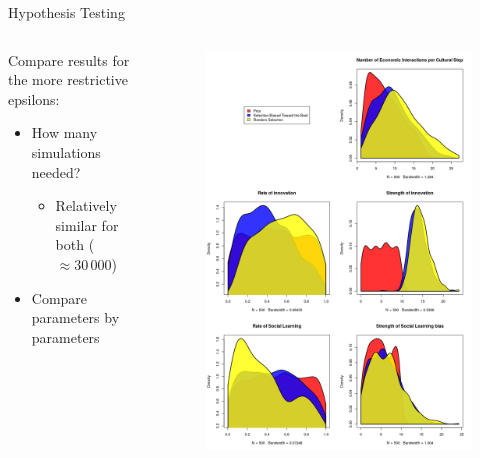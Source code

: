 \documentclass[10pt, notes=show]{beamer}
\begin{document}
\begin{frame}{Hypothesis Testing}
    \begin{columns}

        \begin{column}{0.6\linewidth}
    Compare results for the more restrictive epsilons:
    \begin{itemize}
        \item<+-> How many simulations needed? 
            \begin{itemize}
                \item<+-> Relatively similar for both ($\approx 30\,000$)
            \end{itemize}
        \item<+-> Compare parameters by parameters
    \end{itemize}
        \end{column}
        \begin{column}{0.45\linewidth}
    \begin{figure}
        \includegraphics[height=0.8\textheight]{images/random_vs_bestbias.png}
    \end{figure}

        \end{column}

    \end{columns}
\end{frame}
\end{document}
